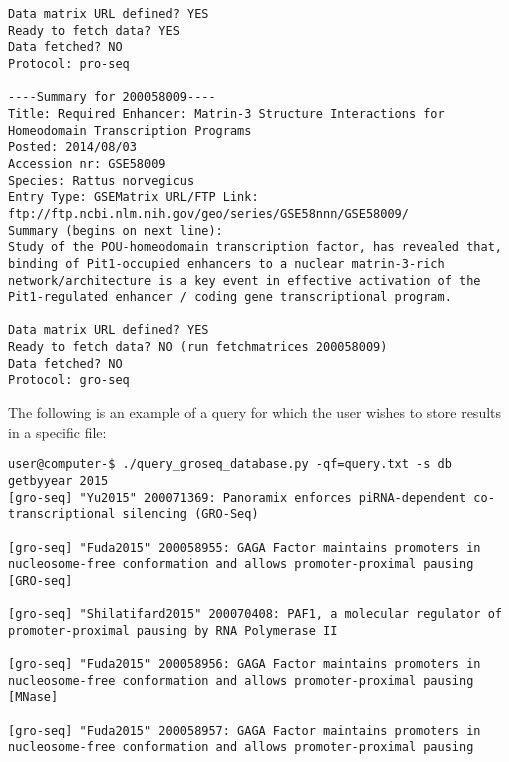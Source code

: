 \documentclass[12pt,letterpaper]{article}
\begin{document}
\begin{verbatim}
Data matrix URL defined? YES
Ready to fetch data? YES
Data fetched? NO
Protocol: pro-seq

----Summary for 200058009----
Title: Required Enhancer: Matrin-3 Structure Interactions for Homeodomain Transcription Programs
Posted: 2014/08/03
Accession nr: GSE58009
Species: Rattus norvegicus
Entry Type: GSEMatrix URL/FTP Link: ftp://ftp.ncbi.nlm.nih.gov/geo/series/GSE58nnn/GSE58009/
Summary (begins on next line):
Study of the POU-homeodomain transcription factor, has revealed that, binding of Pit1-occupied enhancers to a nuclear matrin-3-rich network/architecture is a key event in effective activation of the Pit1-regulated enhancer / coding gene transcriptional program.

Data matrix URL defined? YES
Ready to fetch data? NO (run fetchmatrices 200058009)
Data fetched? NO
Protocol: gro-seq
\end{verbatim}

The following is an example of a query for which the user wishes to store results in a specific file:
\begin{verbatim}
user@computer-$ ./query_groseq_database.py -qf=query.txt -s db getbyyear 2015
[gro-seq] "Yu2015" 200071369: Panoramix enforces piRNA-dependent co-transcriptional silencing (GRO-Seq)

[gro-seq] "Fuda2015" 200058955: GAGA Factor maintains promoters in nucleosome-free conformation and allows promoter-proximal pausing [GRO-seq]

[gro-seq] "Shilatifard2015" 200070408: PAF1, a molecular regulator of promoter-proximal pausing by RNA Polymerase II

[gro-seq] "Fuda2015" 200058956: GAGA Factor maintains promoters in nucleosome-free conformation and allows promoter-proximal pausing [MNase]

[gro-seq] "Fuda2015" 200058957: GAGA Factor maintains promoters in nucleosome-free conformation and allows promoter-proximal pausing
\end{verbatim}
\end{document}
